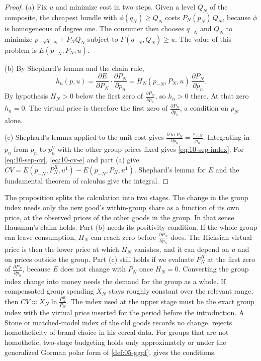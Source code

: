 \begin{proof}
(a) Fix $u$ and minimize cost in two steps. Given a level $Q_N$ of the composite, the cheapest bundle with
$\phi(q_N) \ge Q_N$ costs $P_N(p_N)\,Q_N$, because $\phi$ is homogeneous of degree one. The consumer then
chooses $q_{-N}$ and $Q_N$ to minimize $p_{-N}^\top q_{-N} + P_NQ_N$ subject to $F(q_{-N},Q_N) \ge u$. The
value of this problem is $E(p_{-N},P_N,u)$.

(b) By Shephard's lemma and the chain rule,
\begin{equation*}
  h_n(p,u) = \frac{\partial E}{\partial P_N}\cdot\frac{\partial P_N}{\partial p_n} = H_N(p_{-N},P_N,u)\,\frac{\partial P_N}{\partial p_n}.
\end{equation*}
By hypothesis $H_N > 0$ below the first zero of $\frac{\partial P_N}{\partial p_n}$, so $h_n > 0$ there. At that
zero $h_n = 0$. The virtual price is therefore the first zero of $\frac{\partial P_N}{\partial p_n}$, a condition on
$p_N$ alone.

(c) Shephard's lemma applied to the unit cost gives $\frac{\partial\ln P_N}{\partial p_n} = \frac{w_{n|N}}{p_n}$.
Integrating in $p_n$ from $p_n$ to $p_n^V$ with the other group prices fixed gives \eqref{eq:10-sep-index}. For
\eqref{eq:10-sep-cv}, \eqref{eq:10-cv-e} and part (a) give
$CV = E(p_{-N},P_N^R,u^1) - E(p_{-N},P_N,u^1)$. Shephard's lemma for $E$ and the fundamental theorem of
calculus give the integral.
\end{proof}

The proposition splits the calculation into two stages. The change in the group index needs only the new good's
within-group share as a function of its own price, at the observed prices of the other goods in the group. In
that sense Hausman's claim holds. Part (b) needs its positivity condition. If the whole group can leave consumption,
$H_N$ can reach zero before $\frac{\partial P_N}{\partial p_n}$ does. The Hicksian virtual price is then the lower
price at which $H_N$ vanishes, and it can depend on $u$ and on prices outside the group. Part (c) still holds if we
evaluate $P_N^R$ at the first zero of $\frac{\partial P_N}{\partial p_n}$, because $E$ does not change with $P_N$
once $H_N = 0$. Converting the group index change into money needs the demand for the group
as a whole. If compensated group spending $X_N$ stays roughly constant over the relevant range, then
$CV \approx X_N\ln\frac{P_N^R}{P_N}$. The index used at the upper stage must be the exact group index with the
virtual price inserted for the period before the introduction. A Stone or matched-model index of the old
goods records no change. \citet[p.~221]{Hausman1997} rejects homotheticity of brand choice in his cereal
data. For groups that are not homothetic, two-stage budgeting holds only approximately or under the
generalized Gorman polar form of \cref{def:05-ggpf}. \citet{Gorman1959} gives the conditions.

